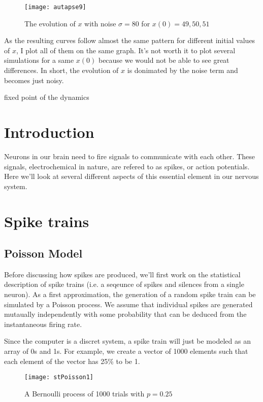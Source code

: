 \vspace{-1em}
\begin{figure}[H]
  \centering
  \texttt{[image: autapse9]}
  \caption
    {The evolution of $x$ with noise $\sigma = 80$ for $x(0) = 49, 50, 51$}
\end{figure}

As the resulting curves follow almost the same pattern for different 
initial values of $x$, I plot all of them on the same graph. It's not worth
it to plot several simulations for a same $x(0)$ because we would not be able
to see great differences. In short, the evolution of $x$ is donimated by
the noise term and becomes just noisy.

\iffalse

fixed point of the dynamics

\section*{Introduction}

Neurons in our brain need to fire signals to communicate with each other. 
These signals, electrochemical in nature, are refered to as spikes, or action
potentials. Here we'll look at several different aspects of this essential
element in our nervous system.


\section{Spike trains}

\subsection{Poisson Model}

Before discussing how spikes are produced, we'll first work on the
statistical description of spike trains (i.e. a seqeunce of spikes and 
silences from a single neuron). As a first approximation, the generation of 
a random spike train can be simulated by a Poisson process. We assume that
individual spikes are generated mutaually independently with some probability 
that can be deduced from the instantaneous firing rate. 

Since the computer is a discret system, a spike train will just be modeled as
an array of 0s and 1s. For example, we create a vector of 1000 elements 
such that each element of the vector has 25\% to be 1.

\begin{figure}[H]
  \centering
  \texttt{[image: stPoisson1]}
  \caption{A Bernoulli process of 1000 trials with $p = 0.25$}
\end{figure}

